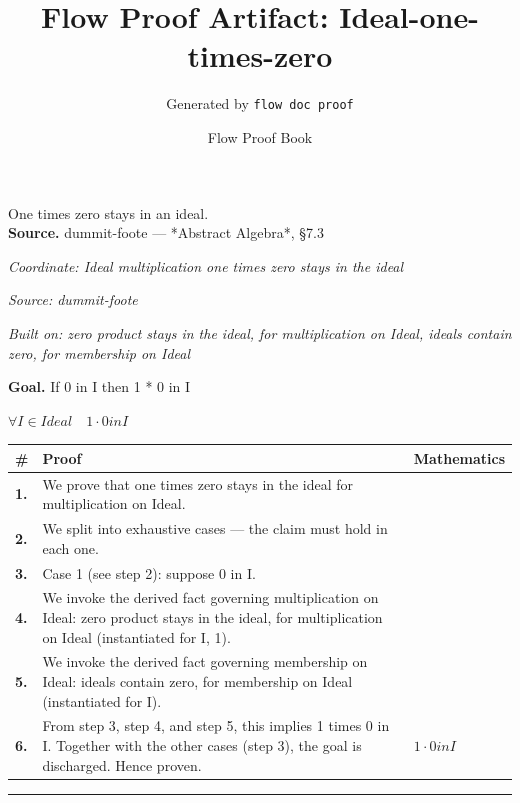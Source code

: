 \documentclass[11pt]{article}
\title{Flow Proof Artifact: Ideal-one-times-zero}
\author{Generated by \texttt{flow doc proof}}
\date{Flow Proof Book}
\theoremstyle{definition}
\begin{document}
\maketitle
One times zero stays in an ideal.\\[0.5em]
\textbf{Source.} dummit-foote — *Abstract Algebra*, §7.3\\[0.5em]
\bigskip
{}\par
\smallskip\noindent\textit{Coordinate: Ideal \cdot multiplication \cdot one times zero stays in the ideal}\par
\smallskip\noindent\textit{Source: dummit-foote}\par
\smallskip\noindent\textit{Built on: zero product stays in the ideal, for multiplication on Ideal, ideals contain zero, for membership on Ideal}\par
\medskip
\noindent\textbf{Goal.} If 0 in I then 1 * 0 in I\par
\noindent$\displaystyle \forall I \in Ideal\quad 1 \cdot 0 in I$\par
\medskip
\noindent
\begin{tabular}{@{} >{\raggedright\arraybackslash}p{} >{\raggedright\arraybackslash}p{} >{\raggedleft\arraybackslash}p{} @{}}
\textbf{\#} & \textbf{Proof} & \textbf{Mathematics} \\
\midrule
\textbf{1.} & We prove that one times zero stays in the ideal for multiplication on Ideal. & \\[0.45em]
\textbf{2.} & We split into exhaustive cases — the claim must hold in each one. & \\[0.45em]
\textbf{3.} & Case 1 (see step 2): suppose 0 in I. & \\[0.45em]
\textbf{4.} & We invoke the derived fact governing multiplication on Ideal: zero product stays in the ideal, for multiplication on Ideal (instantiated for I, 1). & \\[0.45em]
\textbf{5.} & We invoke the derived fact governing membership on Ideal: ideals contain zero, for membership on Ideal (instantiated for I). & \\[0.45em]
\textbf{6.} & From step 3, step 4, and step 5, this implies 1 times 0 in I. Together with the other cases (step 3), the goal is discharged. Hence proven. & $\displaystyle 1 \cdot 0 in I$ \\[0.45em]
\bottomrule
\end{tabular}
\label{thm:Ideal-multiplication-one_times_zero_stays_in_the_ideal}
\par\medskip\hrule
\end{document}
